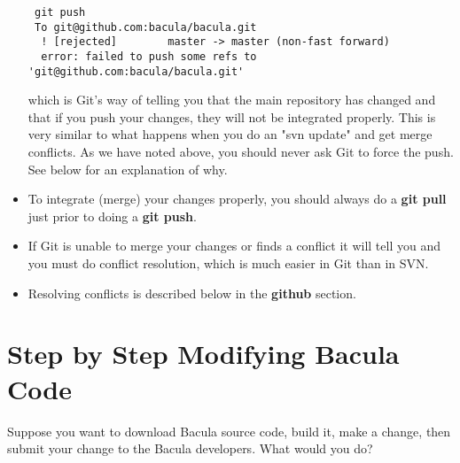 \begin{itemize}
\begin{verbatim}
 git push
 To git@github.com:bacula/bacula.git
  ! [rejected]        master -> master (non-fast forward)
  error: failed to push some refs to 'git@github.com:bacula/bacula.git'
\end{verbatim}

 which is Git's way of telling you that the main repository has changed
 and that if you push your changes, they will not be integrated properly.
 This is very similar to what happens when you do an "svn update" and
 get merge conflicts.
 As we have noted above, you should never ask Git to force the push.
 See below for an explanation of why.
\item To integrate (merge) your changes properly, you should always do 
 a {\bf git pull} just prior to doing a {\bf git push}.
\item If Git is unable to merge your changes or finds a conflict it
  will tell you and you must do conflict resolution, which is much
  easier in Git than in SVN.
\item Resolving conflicts is described below in the {\bf github} section.
\end{itemize}

\section{Step by Step Modifying Bacula Code}
Suppose you want to download Bacula source code, build it, make
a change, then submit your change to the Bacula developers.  What
would you do?

